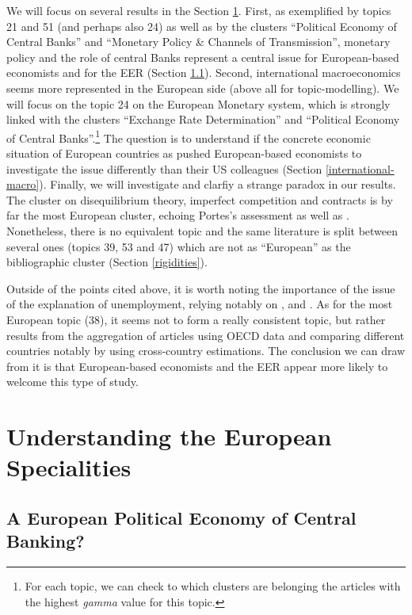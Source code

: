 \documentclass[]{elsarticle} %
\begin{document}
We will focus on several results in the Section
\ref{understanding-specialities}. First, as exemplified by topics 21 and
51 (and perhaps also 24) as well as by the clusters ``Political Economy
of Central Banks'' and ``Monetary Policy \& Channels of Transmission'',
monetary policy and the role of central Banks represent a central issue
for European-based economists and for the EER (Section
\ref{central-banking}). Second, international macroeconomics seems more
represented in the European side (above all for topic-modelling). We
will focus on the topic 24 on the European Monetary system, which is
strongly linked with the clusters ``Exchange Rate Determination'' and
``Political Economy of Central Banks''.\footnote{For each topic, we can
  check to which clusters are belonging the articles with the highest
  \emph{gamma} value for this topic.} The question is to understand if
the concrete economic situation of European countries as pushed
European-based economists to investigate the issue differently than
their US colleagues (Section \ref{international-macro}). Finally, we
will investigate and clarfiy a strange paradox in our results. The
cluster on disequilibrium theory, imperfect competition and contracts is
by far the most European cluster, echoing Portes's
\citeyearpar{portes1987} assessment as well as
\citeyearpar{goutsmedt2021}. Nonetheless, there is no equivalent topic
and the same literature is split between several ones (topics 39, 53 and
47) which are not as ``European'' as the bibliographic cluster (Section
\ref{rigidities}).

Outside of the points cited above, it is worth noting the importance of
the issue of the explanation of unemployment, relying notably on
\citet{pissarides1990}, \citet{mortensen1994} and \citet{layard1991a}.
As for the most European topic (38), it seems not to form a really
consistent topic, but rather results from the aggregation of articles
using OECD data and comparing different countries notably by using
cross-country estimations. The conclusion we can draw from it is that
European-based economists and the EER appear more likely to welcome this
type of study.

\hypertarget{understanding-specialities}{%
\section{Understanding the European
Specialities}\label{understanding-specialities}}

\hypertarget{central-banking}{%
\subsection{A European Political Economy of Central
Banking?}\label{central-banking}}
\end{document}
